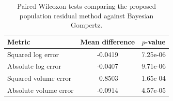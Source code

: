 \begin{table}[t]
\centering
\caption{Paired Wilcoxon tests comparing the proposed population residual method against Bayesian Gompertz.}
\label{tab:nlstt_paired_tests}
\begin{tabular}{lcc}
\toprule
Metric & Mean difference & $p$-value \\
\midrule
Squared log error & -0.0419 & 7.25e-06 \\
Absolute log error & -0.0407 & 9.71e-06 \\
Squared volume error & -0.8503 & 1.65e-04 \\
Absolute volume error & -0.0914 & 4.57e-05 \\
\bottomrule
\end{tabular}
\end{table}
